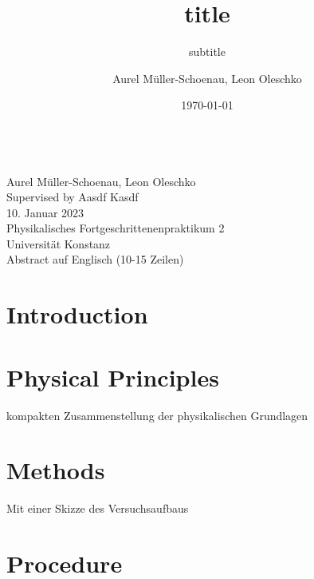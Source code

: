 \documentclass[
    parskip=half, 
    twoside=false,
    twocolumn=true
]{scrarticle}
\begin{document}
\title{title}
\subtitle{subtitle}
\author{Aurel Müller-Schoenau, Leon Oleschko}
\date{\dotdate\today}


\begin{titlepage}
    \sffamily

    \vspace*{3cm}
    {
        \fontsize{32}{32}
    }
    \vspace{.25cm}\\
    {
        \Large
        Aurel Müller-Schoenau, Leon Oleschko\\
        Supervised by Aasdf Kasdf
        \vspace{.05cm}\\
        10. Januar 2023
        \vspace{.25cm}\\
        \normalsize
        Physikalisches Fortgeschrittenenpraktikum 2\\
        Universität Konstanz
    }
    \vspace{3cm}\\
    {
        Abstract auf Englisch (10-15 Zeilen)
        \blindtext[2]
    }
\end{titlepage}


\section{Introduction}
\blindtext

\section{Physical Principles}
kompakten Zusammenstellung der physikalischen Grundlagen
\blindtext

\section{Methods}
Mit einer Skizze des Versuchsaufbaus
\blindtext[3]

\pagebreak
\section{Procedure}
\blindtext[5]

\pagebreak
\end{document}
